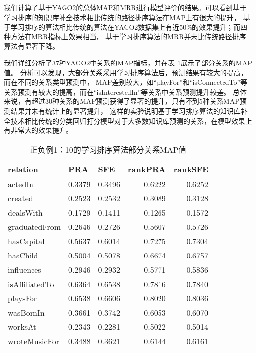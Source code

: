 我们计算了基于YAGO2的总体MAP和MRR进行模型评价的结果。可以看到基于学习排序的知识库补全技术相比传统的路径排序算法在MAP上有很大的提升，
基于学习排序的算法相比传统的算法在YAGO2数据集上有近50\%的效果提升；而四种方法在MRR指标上效果相当，
基于学习排序算法的MRR并未比传统路径排序算法有显著下降。

我们详细分析了37种YAGO2中关系的MAP指标，并在表 \ref{rank}展示了部分关系的MAP值。
分析可以发现，大部分关系采用学习排序算法后，预测结果有较大的提高，而在不同的关系类型预测中，
MAP差别较大，如“playFor”和“isConnectedTo”等关系预测有较大的提高，而在“isInterestedIn”等关系中关系预测提升较差。
总体来说，有超过30种关系的MAP预测获得了显著的提升，只有不到5种关系MAP预测结果并未有统计上的显著提升，
这样的实验说明基于学习排序算法的知识库补全技术相比传统的分类回归打分模型对于大多数知识库预测的关系，在模型效果上有非常大的效果提升。

\begin{table}[htbp]
  \centering
  \caption{正负例1：10的学习排序算法部分关系MAP值}
    \begin{tabular}{|l|r|r|r|r|}
    \hline
    relation & \multicolumn{1}{l|}{PRA} & \multicolumn{1}{l|}{SFE} & \multicolumn{1}{l|}{rankPRA} & \multicolumn{1}{l|}{rankSFE} \\
    \hline
    actedIn & 0.3379  & 0.3496  & 0.6222  & 0.6252  \\
    \hline
    created & 0.2523  & 0.2532  & 0.3089  & 0.3128  \\
    \hline
    dealsWith & 0.1729  & 0.1411  & 0.1265  & 0.1572  \\
    \hline
    graduatedFrom & 0.2646  & 0.2726  & 0.5607  & 0.5726  \\
    \hline
    hasCapital & 0.5637  & 0.6014  & 0.7275  & 0.7304  \\
    \hline
    hasChild & 0.5004  & 0.5078  & 0.6674  & 0.6757  \\
    \hline
    influences & 0.2946  & 0.2932  & 0.5771  & 0.5836  \\
    \hline
    isAffiliatedTo & 0.6364  & 0.6538  & 0.7816  & 0.7840  \\
    \hline
    playsFor & 0.6538  & 0.6606  & 0.8020  & 0.8036  \\
    \hline
    wasBornIn & 0.3661  & 0.3742  & 0.6053  & 0.6070  \\
    \hline
    worksAt & 0.2343  & 0.2281  & 0.5022  & 0.5014  \\
    \hline
    wroteMusicFor & 0.3488  & 0.3621  & 0.6144  & 0.6161  \\
    \hline
    \end{tabular}%
  \label{rank}%
\end{table}%

